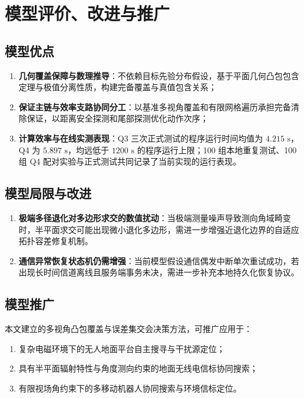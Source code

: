 \documentclass[zihao=-4,a4paper,UTF8]{ctexart}
\begin{document}
\section{模型评价、改进与推广}

\subsection{模型优点}
\begin{enumerate}[leftmargin=2.2em, itemsep=0.01em, topsep=0.01em]
    \item \textbf{几何覆盖保障与数理推导}：不依赖目标先验分布假设，基于平面几何凸包包含定理与极值分离性质，构建完备覆盖与真值包含关系；
    \item \textbf{保证主链与效率支路协同分工}：以基准多视角覆盖和有限网格遍历承担完备清除保证，以距离安全探测和尾部探测优化动作次序；
    \item \textbf{计算效率与在线实测表现}：Q3 三次正式测试的程序运行时间均值为 $4.215\text{ s}$，Q4 为 $5.897\text{ s}$，均远低于 $1200\text{ s}$ 的程序运行上限；100 组本地重复测试、100 组 Q4 配对实验与正式测试共同记录了当前实现的运行表现。
\end{enumerate}

\subsection{模型局限与改进}
\begin{enumerate}[leftmargin=2.2em, itemsep=0.01em, topsep=0.01em]
    \item \textbf{极端多径退化对多边形求交的数值扰动}：当极端测量噪声导致测向角域畸变时，半平面求交可能出现微小退化多边形，需进一步增强近退化边界的自适应拓扑容差修复机制。
    \item \textbf{通信异常恢复状态机仍需增强}：当前模型假设通信偶发中断单次重试成功，若出现长时间信道离线且服务端事务未决，需进一步补充本地持久化恢复协议。
\end{enumerate}

\subsection{模型推广}
本文建立的多视角凸包覆盖与误差集交会决策方法，可推广应用于：
\begin{enumerate}[leftmargin=2.2em, itemsep=0.01em, topsep=0.01em]
    \item 复杂电磁环境下的无人地面平台自主搜寻与干扰源定位；
    \item 具有半平面辐射特性与角度测向约束的地面无线电信标协同搜索；
    \item 有限视场角约束下的多移动机器人协同搜索与环境信标定位。
\end{enumerate}
\end{document}
